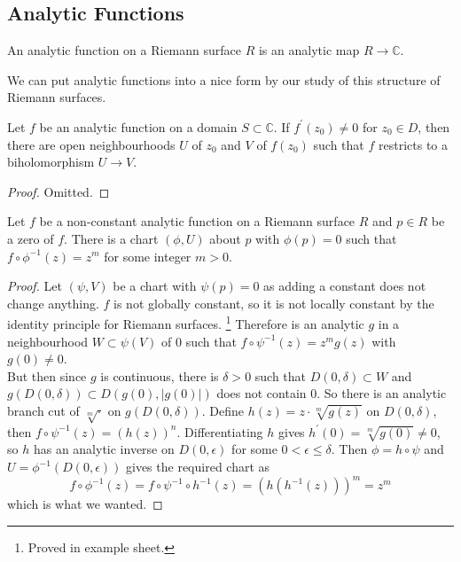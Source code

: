 \subsection{Analytic Functions}
\begin{definition}
    An analytic function on a Riemann surface $R$ is an analytic map $R\to\mathbb C$.
\end{definition}
We can put analytic functions into a nice form by our study of this structure of Riemann surfaces.
\begin{theorem}
    Let $f$ be an analytic function on a domain $S\subset\mathbb C$.
    If $f^\prime(z_0)\neq 0$ for $z_0\in D$, then there are open neighbourhoods $U$ of $z_0$ and $V$ of $f(z_0)$ such that $f$ restricts to a biholomorphism $U\to V$.
\end{theorem}
\begin{proof}
    Omitted.
\end{proof}
\begin{proposition}\label{local_p_k}
    Let $f$ be a non-constant analytic function on a Riemann surface $R$ and $p\in R$ be a zero of $f$.
    There is a chart $(\phi,U)$ about $p$ with $\phi(p)=0$ such that $f\circ\phi^{-1}(z)=z^m$ for some integer $m>0$.
\end{proposition}
\begin{proof}
    Let $(\psi,V)$ be a chart with $\psi(p)=0$ as adding a constant does not change anything.
    $f$ is not globally constant, so it is not locally constant by the identity principle for Riemann surfaces.
    \footnote{Proved in example sheet.}
    Therefore is an analytic $g$ in a neighbourhood $W\subset\psi(V)$ of $0$ such that $f\circ\psi^{-1}(z)=z^mg(z)$ with $g(0)\neq 0$.\\
    But then since $g$ is continuous, there is $\delta>0$ such that $D(0,\delta)\subset W$ and $g(D(0,\delta))\subset D(g(0),|g(0)|)$ does not contain $0$.
    So there is an analytic branch cut of $\sqrt[m]{\cdot}$ on $g(D(0,\delta))$.
    Define $h(z)=z\cdot\sqrt[m]{g(z)}$ on $D(0,\delta)$, then $f\circ\psi^{-1}(z)=(h(z))^n$.
    Differentiating $h$ gives $h^\prime(0)=\sqrt[m]{g(0)}\neq 0$, so $h$ has an analytic inverse on $D(0,\epsilon)$ for some $0<\epsilon\le\delta$.
    Then $\phi=h\circ\psi$ and $U=\phi^{-1}(D(0,\epsilon))$ gives the required chart as
    $$f\circ\phi^{-1}(z)=f\circ\psi^{-1}\circ h^{-1}(z)=(h(h^{-1}(z)))^m=z^m$$
    which is what we wanted.
\end{proof}